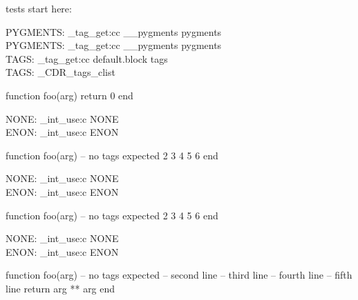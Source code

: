 \bgroup

tests start here:


\ExplSyntaxOn
PYGMENTS: \CDR_tag_get:cc { __pygments } { pygments } \\
\ExplSyntaxOff
{}
\ExplSyntaxOn
PYGMENTS: \CDR_tag_get:cc { __pygments } { pygments } \\
TAGS: \CDR_tag_get:cc { default.block } { tags } \\
TAGS: \g_CDR_tags_clist \\
\ExplSyntaxOff
\begin{CDRBlock}[
  stepnumber=1,
]
function foo(arg) return 0 end
\end{CDRBlock}

\ExplSyntaxOn
NONE: \CDR_int_use:c { NONE } \\
ENON: \CDR_int_use:c { ENON } \\
\ExplSyntaxOff

\begin{CDRBlock}[
  stepnumber=1,
  firstnumber = last,
]
function foo(arg) -- no tags expected
  2
  3
  4
  5
  6
end
\end{CDRBlock}

\ExplSyntaxOn
NONE: \CDR_int_use:c { NONE } \\
ENON: \CDR_int_use:c { ENON } \\
\ExplSyntaxOff

\begin{CDRBlock}[
  stepnumber=1,
  firstnumber = auto,
]
function foo(arg) -- no tags expected
  2
  3
  4
  5
  6
end
\end{CDRBlock}
\ExplSyntaxOn
NONE: \CDR_int_use:c { NONE } \\
ENON: \CDR_int_use:c { ENON } \\
\ExplSyntaxOff

\begin{CDRBlock}[
  pygments,
  lang=lua,
  numbers=none,
  debug,
  show tags=none,
  only top=false,
]
function foo(arg) -- no tags expected
  -- second line
  -- third line
  -- fourth line
  -- fifth line
  return arg ** arg
end
\end{CDRBlock}



